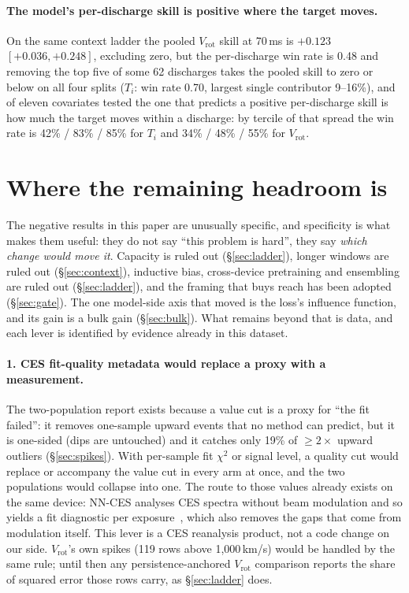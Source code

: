 \documentclass[10pt]{article}
\newcommand{\Ti}{\ensuremath{T_i}}
\newcommand{\Vrot}{\ensuremath{V_\mathrm{rot}}}
\begin{document}
\paragraph{The model's per-discharge skill is positive where the target moves.}
On the same context ladder the pooled \Vrot{} skill at 70\,ms is $+0.123$
$[+0.036, +0.248]$, excluding zero, but the per-discharge win rate is 0.48 and
removing the top five of some 62 discharges takes the pooled skill to zero or below
on all four splits (\Ti{}: win rate 0.70, largest single contributor 9--16\%), and of
eleven covariates tested the one that predicts a positive per-discharge skill is how
much the target moves within a discharge: by tercile of that spread the win rate is
42\% / 83\% / 85\% for \Ti{} and 34\% / 48\% / 55\% for \Vrot{}.

\section{Where the remaining headroom is}
\label{sec:headroom}

The negative results in this paper are unusually specific, and specificity is what
makes them useful: they do not say ``this problem is hard'', they say \emph{which
change would move it}. Capacity is ruled out (\S\ref{sec:ladder}), longer windows
are ruled out (\S\ref{sec:context}), inductive bias, cross-device pretraining and
ensembling are ruled out (\S\ref{sec:ladder}), and the framing that buys reach has
been adopted (\S\ref{sec:gate}). The one model-side axis that moved is the loss's
influence function, and its gain is a bulk gain (\S\ref{sec:bulk}). What remains
beyond that is data, and each lever is identified by evidence already in this
dataset.

\paragraph{1. CES fit-quality metadata would replace a proxy with a measurement.}
The two-population report exists because a value cut is a proxy for ``the fit
failed'': it removes one-sample upward events that no method can predict, but it
is one-sided (dips are untouched) and it catches only 19\% of $\geq 2\times$
upward outliers (\S\ref{sec:spikes}). With per-sample fit $\chi^2$ or signal
level, a quality cut would replace or accompany the value cut in every arm at
once, and the two populations would collapse into one. The route to those
values already exists on the same device: NN-CES analyses CES spectra without
beam modulation and so yields a fit diagnostic per
exposure~\citep{Lee2026NeuralNetworkbased}, which also removes the gaps that come
from modulation itself. This lever is a CES reanalysis product, not a code change
on our side. \Vrot{}'s own spikes
(119 rows above 1{,}000\,km/s) would be handled by the same rule; until then any
persistence-anchored \Vrot{} comparison reports the share of squared error those
rows carry, as \S\ref{sec:ladder} does.
\end{document}
